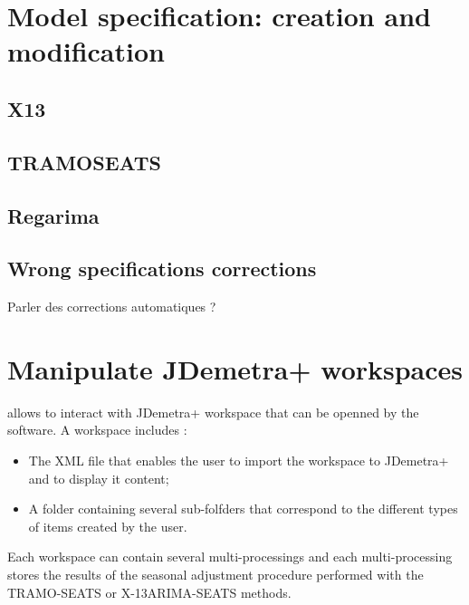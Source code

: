\documentclass[article]{jss}
\providecommand{\tightlist}{%
  \setlength{\itemsep}{0pt}\setlength{\parskip}{0pt}}
\begin{document}
\hypertarget{model-specification-creation-and-modification}{%
\section{Model specification: creation and
modification}\label{model-specification-creation-and-modification}}

\hypertarget{x13}{%
\subsection{X13}\label{x13}}

\hypertarget{tramoseats}{%
\subsection{TRAMOSEATS}\label{tramoseats}}

\hypertarget{regarima-1}{%
\subsection{Regarima}\label{regarima-1}}

\hypertarget{wrong-specifications-corrections}{%
\subsection{Wrong specifications
corrections}\label{wrong-specifications-corrections}}

Parler des corrections automatiques ?

\hypertarget{manipulate-workspace}{%
\section{Manipulate JDemetra+ workspaces}\label{manipulate-workspace}}

 allows to interact with JDemetra+ workspace that can be
openned by the software. A workspace includes :

\begin{itemize}
\tightlist
\item
  The XML file that enables the user to import the workspace to
  JDemetra+ and to display it content;\\
\item
  A folder containing several sub-folfders that correspond to the
  different types of items created by the user.
\end{itemize}

Each workspace can contain several multi-processings and each
multi-processing stores the results of the seasonal adjustment procedure
performed with the TRAMO-SEATS or X-13ARIMA-SEATS methods.
\end{document}
